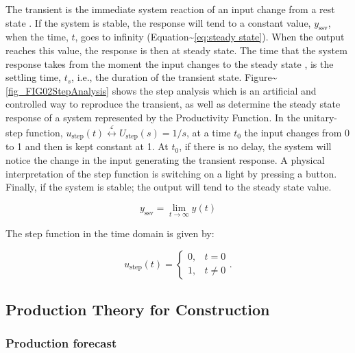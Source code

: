 \documentclass{article}
\begin{document}
The transient is the immediate system reaction of an input change from a rest state \citep{Ogata2010}.
If the system is stable, the response will tend to a constant value, \(y_{\mbox{ssv}}\), when the time, \(t\), goes to infinity (Equation\textasciitilde{}\ref{eq:steady state}).
When the output reaches this value, the response is then at steady state.
The time that the system response takes from the moment the input changes to the steady state \citep{Nise2010,Ogata2010}, is the settling time, \(t_s\), i.e., the duration of the transient state.
Figure\textasciitilde{}\ref{fig_FIG02StepAnalysis} shows the step analysis which is an artificial and controlled way to reproduce the transient, as well as determine the steady state response of a system represented by the Productivity Function.
In the unitary-step function, \(u_{\mbox{step}}(t) \overset{\underset{\mathrm{\mathcal{L}}}{}}{\leftrightarrow} U_{\mbox{step}}(s) = 1/s\), at a time \(t_0\) the input changes from 0 to 1 and then is kept constant at 1.
At \(t_0\), if there is no delay, the system will notice the change in the input generating the transient response.
A physical interpretation of the step function is switching on a light by pressing a button.
Finally, if the system is stable; the output will tend to the steady state value.

\begin{equation}\label{eq:steady state}
	y_{\mbox{ssv}} = \lim_{t\rightarrow \infty} y(t)
\end{equation}

The step function in the time domain is given by:

\begin{equation}\label{eq:Step function in time domain P7}
	u_{\mbox{step}}(t) =
	\begin{cases}
 	0, & t = 0 \\
  	1, & t \ne 0
	\end{cases}.
\end{equation}

\subsection{Production Theory for Construction}
\label{sec:orge76c03b}
\subsubsection{Production forecast}
\label{sec:org710d42a}
\end{document}
